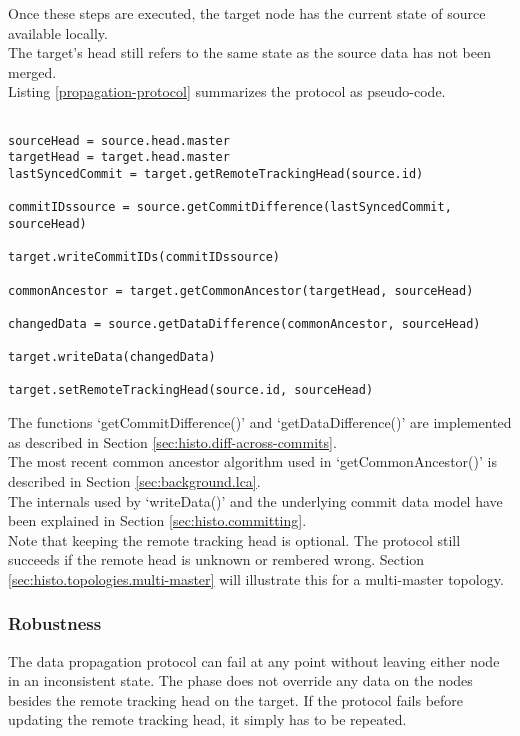 Once these steps are executed, the target node has the current state of source available locally.\\
The target's head still refers to the same state as the source data has not been merged.\\

Listing \ref{propagation-protocol} summarizes the protocol as pseudo-code.\\

\begin{lstlisting}[caption=Detecting updates across nodes and propagating the changes., label=propagation-protocol]

sourceHead = source.head.master
targetHead = target.head.master
lastSyncedCommit = target.getRemoteTrackingHead(source.id)

commitIDssource = source.getCommitDifference(lastSyncedCommit, sourceHead)

target.writeCommitIDs(commitIDssource)

commonAncestor = target.getCommonAncestor(targetHead, sourceHead)

changedData = source.getDataDifference(commonAncestor, sourceHead)

target.writeData(changedData)

target.setRemoteTrackingHead(source.id, sourceHead)

\end{lstlisting}

The functions `getCommitDifference()' and `getDataDifference()' are implemented as described in Section \ref{sec:histo.diff-across-commits}.\\
The most recent common ancestor algorithm used in `getCommonAncestor()' is described in Section \ref{sec:background.lca}.\\
The internals used by `writeData()' and the underlying commit data model have been explained in Section \ref{sec:histo.committing}.\\
Note that keeping the remote tracking head is optional.
The protocol still succeeds if the remote head is unknown or rembered wrong.
Section \ref{sec:histo.topologies.multi-master} will illustrate this for a multi-master topology. 

\subsubsection*{Robustness}
The data propagation protocol can fail at any point without leaving either node in an inconsistent state.
The phase does not override any data on the nodes besides the remote tracking head on the target.
If the protocol fails before updating the remote tracking head, it simply has to be repeated.

